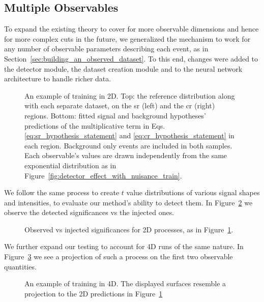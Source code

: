 \documentclass[paper/ddppaper2.tex]{subfiles}
\begin{document}
\subsection{Multiple Observables}

To expand the existing theory to cover for more observable dimensions and hence for more complex cuts in the future, we generalized the mechanism to work for any number of observable parameters describing each event, as in Section~\ref{sec:building_an_observed_dataset}. To this end, changes were added to the detector module, the dataset creation module and to the neural network architecture to handle richer data.

\begin{figure}
    \caption{An example of training in 2D. Top: the reference distribution along with each separate dataset, on the \gls{sr} (left) and the \gls{cr} (right) regions. Bottom: fitted signal and background hypotheses' predictions of the multiplicative term in Eqs.\ref{eq:sr_hypothesis_statement} and \ref{eq:cr_hypothesis_statement} in each region. Background only events are included in both samples. Each observable's values are drawn independently from the same exponential distribution as in Figure~\ref{fig:detector_effect_with_nuisance_train}.}
    \label{fig:2d_train}
\end{figure}


We follow the same process to create $t$ value distributions of various signal shapes and intensities, to evaluate our method's ability to detect them. In Figure~\ref{fig:2d_significances} we observe the detected significances vs the injected ones.

\begin{figure}
    \caption{Observed vs injected significances for 2D processes, as in Figure~\ref{fig:2d_train}.}
    \label{fig:2d_significances}
\end{figure}
\ifdefined\paper\clearpage\fi


We further expand our testing to account for 4D runs of the same nature. In Figure~\ref{fig:4d_train} we see a projection of such a process on the first two observable quantities.

\begin{figure}
    \caption{An example of training in 4D. The displayed surfaces resemble a projection to the 2D predictions in Figure~\ref{fig:2d_train}}
    \label{fig:4d_train}
\end{figure}
\end{document}
